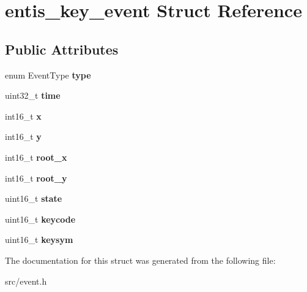 \hypertarget{structentis__key__event}{}\section{entis\+\_\+key\+\_\+event Struct Reference}
\label{structentis__key__event}
\subsection*{Public Attributes}
\begin{DoxyCompactItemize}
\item 
\mbox{\label{structentis__key__event_acf5927b79e4dc860edfbe3ca528bb561}} 
enum Event\+Type {\bfseries type}
\item 
\mbox{\label{structentis__key__event_a50963a0de17809b9e6da95288a38eb6f}} 
uint32\+\_\+t {\bfseries time}
\item 
\mbox{\label{structentis__key__event_a506b13b95005a5674abd7d2f68d6fe7d}} 
int16\+\_\+t {\bfseries x}
\item 
\mbox{\label{structentis__key__event_afb1a26213a56db1c831bd068ba36eda4}} 
int16\+\_\+t {\bfseries y}
\item 
\mbox{\label{structentis__key__event_a6ab80ff4f3761ad52713d056b914c4ab}} 
int16\+\_\+t {\bfseries root\+\_\+x}
\item 
\mbox{\label{structentis__key__event_abe0d855028123011428db2790b3d00f3}} 
int16\+\_\+t {\bfseries root\+\_\+y}
\item 
\mbox{\label{structentis__key__event_a9a68092a49f632fa014c9dd1e90a171a}} 
uint16\+\_\+t {\bfseries state}
\item 
\mbox{\label{structentis__key__event_a2c2b3c23726c27aab6299264c22f6797}} 
uint16\+\_\+t {\bfseries keycode}
\item 
\mbox{\label{structentis__key__event_a04505239e7938b75f4ce3db9bec843f3}} 
uint16\+\_\+t {\bfseries keysym}
\end{DoxyCompactItemize}


The documentation for this struct was generated from the following file\+:\begin{DoxyCompactItemize}
\item 
src/event.\+h\end{DoxyCompactItemize}
